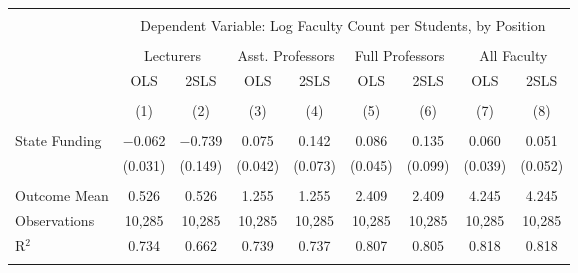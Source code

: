 
\begin{tabular}{@{\extracolsep{5pt}}lcccccccc} 
\\[-1.8ex]\hline 
\hline \\[-1.8ex] 
 & \multicolumn{8}{c}{Dependent Variable: Log Faculty Count per Students, by Position} \\ 
\cline{2-9} 
\\[-1.8ex] & \multicolumn{2}{c}{Lecturers} & \multicolumn{2}{c}{Asst. Professors} & \multicolumn{2}{c}{Full Professors} & \multicolumn{2}{c}{All Faculty} \\ 
 & OLS & 2SLS & OLS & 2SLS & OLS & 2SLS & OLS & 2SLS \\ 
\\[-1.8ex] & (1) & (2) & (3) & (4) & (5) & (6) & (7) & (8)\\ 
\hline \\[-1.8ex] 
 State Funding & $-$0.062 & $-$0.739 & 0.075 & 0.142 & 0.086 & 0.135 & 0.060 & 0.051 \\ 
  & (0.031) & (0.149) & (0.042) & (0.073) & (0.045) & (0.099) & (0.039) & (0.052) \\ 
 \hline \\[-1.8ex] 
Outcome Mean & 0.526 & 0.526 & 1.255 & 1.255 & 2.409 & 2.409 & 4.245 & 4.245 \\ 
Observations & 10,285 & 10,285 & 10,285 & 10,285 & 10,285 & 10,285 & 10,285 & 10,285 \\ 
R$^{2}$ & 0.734 & 0.662 & 0.739 & 0.737 & 0.807 & 0.805 & 0.818 & 0.818 \\ 
\hline 
\hline \\[-1.8ex] 
\end{tabular} 

